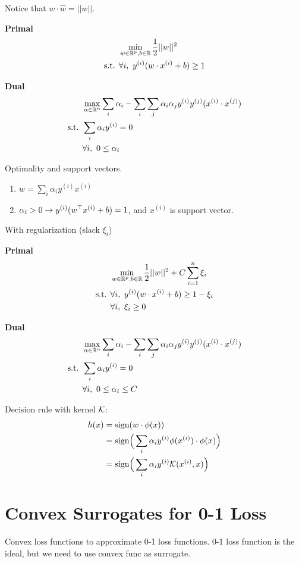 \documentclass[a4paper]{report}
\begin{document}
Notice that $w \cdot \hat w=||w||$.

\textbf{Primal}
\begin{align*}
& \min_{w\in \mathbb{R}^p, b\in \mathbb{R}} \frac{1}{2}||w||^2\\ 
\text{s.t. } & \forall i,~ y^{(i)}(w \cdot x^{(i)}+b)\geq 1 
\end{align*}

\textbf{Dual}
\begin{align*}
& \max_{\alpha \in \mathbb{R}^n} \sum_i \alpha_i -\sum_i\sum_j \alpha_i \alpha_j y^{(i)}y^{(j)}(x^{(i)}\cdot x^{(j)}) \\
\text{s.t. } & \sum_i \alpha_i y^{(i)} = 0\\
& \forall i,~ 0\leq\alpha_i 
\end{align*}

Optimality and support vectors. 
\begin{enumerate}
\item $w=\sum_i \alpha_i y^{(i)} x^{(i)}$ 
\item $\alpha_i >0 \rightarrow y^{(i)}(w^\top x^{(i)}+b)=1$, and $x^{(i)}$ is support vector.
\end{enumerate}

With regularization (slack $\xi_i$)

\textbf{Primal}
\begin{align*}
& \min_{w\in \mathbb{R}^p, b\in \mathbb{R}} \frac{1}{2}||w||^2+C\sum_{i=1}^n\xi_i\\ 
\text{s.t. } & \forall i,~ y^{(i)}(w \cdot x^{(i)}+b)\geq 1 -\xi_i \\
& \forall i,~\xi_i \geq 0
\end{align*}

\textbf{Dual}
\begin{align*}
& \max_{\alpha \in \mathbb{R}^n} \sum_i \alpha_i -\sum_i\sum_j \alpha_i \alpha_j y^{(i)}y^{(j)}(x^{(i)}\cdot
x^{(j)}) \\
\text{s.t. } & \sum_i \alpha_i y^{(i)} = 0\\
& \forall i,~0\leq \alpha_i \leq C
\end{align*}

Decision rule with kernel $\mathcal{K}$: 
\begin{align*}
h(x) &= \text{sign}(w \cdot \phi(x))  \\
&= \text{sign}\Big(\sum_i \alpha_iy^{(i)} \phi(x^{(i)}) \cdot \phi(x)\Big) \\
&= \text{sign}\Big(\sum_i \alpha_i y^{(i)} \mathcal{K}(x^{(i)}, x)\Big)
\end{align*}

\section{Convex Surrogates for 0-1 Loss}
Convex loss functions to approximate 0-1 loss functions. 0-1 loss function is the ideal, but we need to use convex func as surrogate.
\end{document}
